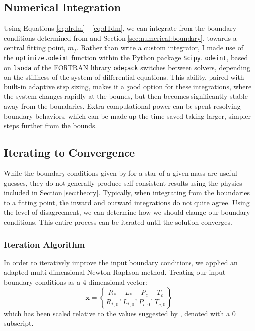 \subsection{Numerical Integration}
\label{sec:numerical:integrator}
Using Equations \ref{eq:drdm} - \ref{eq:dTdm}, we can integrate from the boundary conditions determined from \cite{Hansen} and Section \ref{sec:numerical:boundary}, towards a central fitting point, $m_f$.
Rather than write a custom integrator, I made use of the \texttt{optimize.odeint} function within the Python package \texttt{Scipy}.  \texttt{odeint}, based on \texttt{lsoda} of the FORTRAN library \texttt{odepack} switches between solvers, depending on the stiffness of the system of differential equations.  This ability, paired with built-in adaptive step sizing, makes it a good option for these integrations, where the system changes rapidly at the bounds, but then becomes significantly stable away from the boundaries. Extra computational power can be spent resolving boundary behaviors, which can be made up the time saved taking larger, simpler steps further from the bounds.


\subsection{Iterating to Convergence}
\label{sec:numerical:convergence}
While the boundary conditions given by \cite{Hansen} for a star of a given mass are useful guesses, they do not generally produce self-consistent results using the physics included in Section \ref{sec:theory}.  Typically, when integrating from the boundaries to a fitting point, the inward and outward integrations do not quite agree.  Using the level of disagreement, we can determine how we should change our boundary conditions.  This entire process can be iterated until the solution converges.

\subsubsection{Iteration Algorithm}
\label{sec:numerical:convergence:algorithm}
In order to iteratively improve the input boundary conditions, we applied an adapted multi-dimensional Newton-Raphson method.  Treating our input boundary conditions as a 4-dimensional vector:
\begin{equation}
  \mathbf{x} = \left\{\frac{R_\ast}{R_{\ast,0}}, \frac{L_\ast}{L_{\ast,0}}, \frac{P_c}{P_{c,0}}, \frac{T_c}{T_{c,0}} \right\}
\end{equation}
which has been scaled relative to the values suggested by \cite{Hansen}, denoted with a $0$ subscript.

